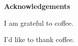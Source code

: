\thispagestyle{empty}

\begin{center}
    {\LARGE\bf Acknowledgements}
\end{center}

I am grateful to coffee.

I'd like to thank coffee.
